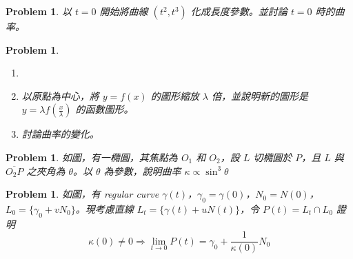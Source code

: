 \documentclass[10pt,a4paper]{article}
\newcounter{theProblemCounter}
\newtheorem{problem}[theProblemCounter]{Problem}
\begin{document}
\setcounter{theProblemCounter}{4}
\begin{problem}
以 $t=0$ 開始將曲線 $(t^2, t^3)$ 化成長度參數。並討論 $t=0$ 時的曲率。
\end{problem}

\setcounter{theProblemCounter}{5}
\begin{problem}
\begin{enumerate}
\item[]
\item[(a)] 以原點為中心，將 $y=f(x)$ 的圖形縮放 $\lambda$ 倍，並說明新的圖形是 $y=\lambda f(\frac{x}{\lambda})$ 的函數圖形。
\item[(b)] 討論曲率的變化。
\end{enumerate}
\end{problem}

\setcounter{theProblemCounter}{6}
\begin{problem}
如圖，有一橢圓，其焦點為 $O_1$ 和 $O_2$，設 $L$ 切橢圓於 $P$，且 $L$ 與 $\overline{O_2P}$ 之夾角為 $\theta$。以 $\theta$ 為參數，說明曲率 $\kappa\propto\sin^3\theta$
\end{problem}

\setcounter{theProblemCounter}{8}
\begin{problem}
如圖，有 regular curve $\gamma(t)$，$\gamma_0=\gamma(0)$，$N_0=N(0)$，$L_0=\{\gamma_0+vN_0\}$。現考慮直線 $L_t=\{\gamma(t)+uN(t)\}$，令 $P(t)=L_t\cap L_0$ 證明
\[\kappa(0)\ne 0\Rightarrow \lim_{t\to 0}P(t)=\gamma_0 + \frac{1}{\kappa(0)}N_0\]
\end{problem}
\end{document}
